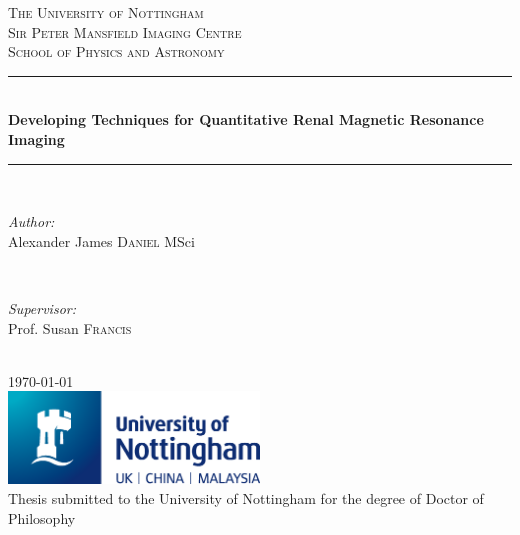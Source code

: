 \documentclass[11pt,a4paper,oneside]{report}
\author{Alexander James Daniel}
\newcommand\blankpage{
    \null
    \thispagestyle{empty}
    \addtocounter{page}{-1}
    \newpage}
\begin{document}
{
\begin{titlepage}

\newcommand{\HRule}{\rule{\linewidth}{0.5mm}}
\center
 
\textsc{\LARGE The University of Nottingham}\\[0.5cm]
\textsc{\Large Sir Peter Mansfield Imaging Centre}\\[0.5cm]
\textsc{\large School of Physics and Astronomy}\\[0.5cm]

\HRule \\[0.4cm]
{ \Large \bfseries Developing Techniques for Quantitative Renal Magnetic Resonance Imaging}\\[0.2cm]
\HRule \\[1.5cm]

\begin{minipage}{0.4\textwidth}
\begin{flushleft} \large
\emph{Author:}\\
Alexander James \textsc{Daniel} MSci
\end{flushleft}
\end{minipage}
~
\begin{minipage}{0.4\textwidth}
\begin{flushright} \large
\emph{Supervisor:} \\
Prof. Susan \textsc{Francis}
\end{flushright}
\end{minipage}\\[4cm]
{\large \today}\\[2cm]

\includegraphics[width=0.5\textwidth]{UoN_Primary_Logo_CMYK.eps}\\[1cm]
 Thesis submitted to the University of Nottingham for the degree of Doctor of Philosophy
\vfill
\afterpage{\blankpage}
\end{titlepage}
}
\pagestyle{mystyle}

\end{document}
